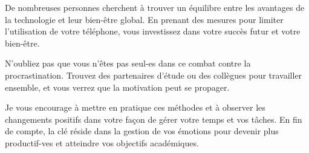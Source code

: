 \documentclass[a4paper, 12pt, garamond]{book}
\begin{document}
De nombreuses personnes cherchent à trouver un équilibre entre les avantages de
la technologie et leur bien-être global. En prenant des mesures pour limiter
l'utilisation de votre téléphone, vous investissez dans votre succès futur et
votre bien-être.

N'oubliez pas que vous n'êtes pas seul-es dans ce combat contre la
procrastination. Trouvez des partenaires d'étude ou des collègues pour
travailler ensemble, et vous verrez que la motivation peut se propager.

Je vous encourage à mettre en pratique ces méthodes et à observer les
changements positifs dans votre façon de gérer votre temps et vos tâches. En fin
de compte, la clé réside dans la gestion de vos émotions pour devenir plus
productif-ves et atteindre vos objectifs académiques.

%
%
%
%
%
%
\end{document}
